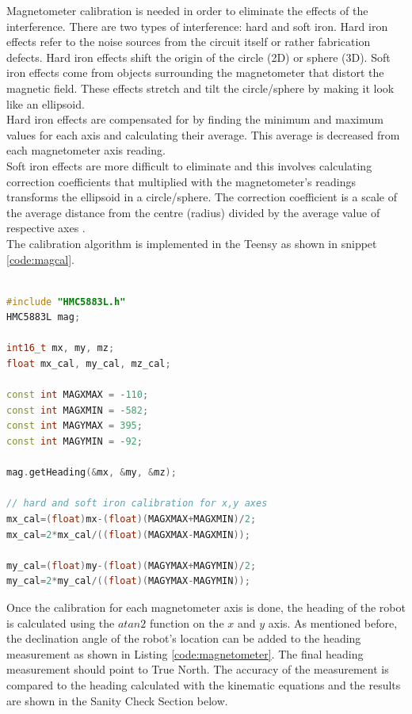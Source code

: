 Magnetometer calibration is needed in order to eliminate the effects of the interference. There are two types of interference: hard and soft iron. Hard iron effects refer to the noise sources from the circuit itself or rather fabrication defects. Hard iron effects shift the origin of the circle (2D) or sphere (3D). Soft iron effects come from objects surrounding the magnetometer that distort the magnetic field. These effects stretch and tilt the circle/sphere by making it look like an ellipsoid.\\

Hard iron effects are compensated for by finding the minimum and maximum values for each axis and calculating their average. This average is decreased from each magnetometer axis reading. \\

Soft iron effects are more difficult to eliminate and this involves calculating correction coefficients that multiplied with the magnetometer's readings transforms the ellipsoid in a circle/sphere. The correction coefficient is a scale of the average distance from the centre (radius) divided by the average value of respective axes \cite{magnetometercal}.\\

The calibration algorithm is implemented in the Teensy as shown in snippet \ref{code:magcal}.

\begin{lstlisting}[language=C++, caption={Hard and Soft Iron Effects - Magnetometer Calibration.}, label={code:magcal}]

#include "HMC5883L.h"
HMC5883L mag;

int16_t mx, my, mz;
float mx_cal, my_cal, mz_cal;

const int MAGXMAX = -110;
const int MAGXMIN = -582;
const int MAGYMAX = 395;
const int MAGYMIN = -92;

mag.getHeading(&mx, &my, &mz);

// hard and soft iron calibration for x,y axes
mx_cal=(float)mx-(float)(MAGXMAX+MAGXMIN)/2;
mx_cal=2*mx_cal/((float)(MAGXMAX-MAGXMIN));

my_cal=(float)my-(float)(MAGYMAX+MAGYMIN)/2;
my_cal=2*my_cal/((float)(MAGYMAX-MAGYMIN));


\end{lstlisting}

Once the calibration for each magnetometer axis is done, the heading of the robot is calculated using the $atan2$ function on the $x$ and $y$ axis. As mentioned before, the declination angle of the robot's location can be added to the heading measurement as shown in Listing \ref{code:magnetometer}. The final heading measurement should point to True North. The accuracy of the measurement is compared to the heading calculated with the kinematic equations and the results are shown in the Sanity Check Section below.

